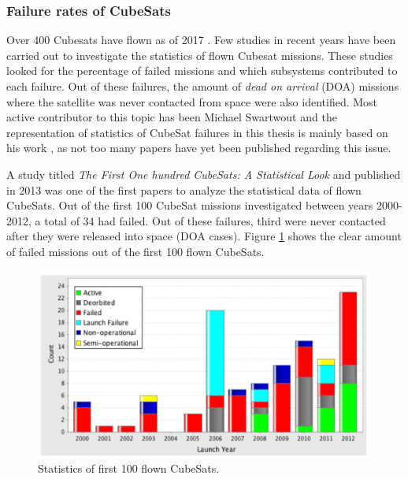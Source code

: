 \documentclass[english,12pt,a4paper,pdftex,elec,utf8]{aaltothesis}
\begin{document}
\subsubsection{Failure rates of CubeSats}
Over 400 Cubesats have flown as of 2017 \cite{Swart2016}. Few studies in recent years have been carried out to investigate the statistics of flown Cubesat missions. These studies looked for the percentage of failed missions and which subsystems contributed to each failure. Out of these failures, the amount of \textit{dead on arrival} (DOA) missions where the satellite was never contacted from space were also identified. Most active contributor to this topic has been Michael Swartwout and the representation of statistics of CubeSat failures in this thesis is mainly based on his work \cite{Swart1, Swart2016, Swart2015}, as not too many papers have yet been published regarding this issue.\par 
A study titled \textit{The First One hundred CubeSats: A Statistical Look} and published in 2013 was one of the first papers to analyze the statistical data of flown CubeSats. Out of the first 100 CubeSat missions investigated between years 2000-2012, a total of 34 had failed. Out of these failures, third were never contacted after they were released into space (DOA cases). Figure \ref{100first} shows the clear amount of failed missions out of the first 100 flown CubeSats. \cite{Swart1} \par
\begin{figure}[h!]
\centering
\includegraphics[scale=0.3]{2013_failures}
\caption{Statistics of first 100 flown CubeSats. \cite{Swart1}}
\label{100first}
\end{figure} 
\end{document}
